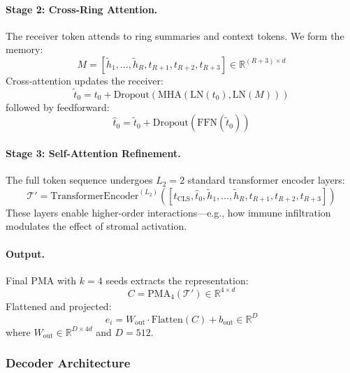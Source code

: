 \paragraph{Stage 2: Cross-Ring Attention.} The receiver token attends to ring summaries and context tokens. We form the memory:
\begin{equation}
    M = [\tilde{h}_1, \ldots, \tilde{h}_R, t_{R+1}, t_{R+2}, t_{R+3}] \in \mathbb{R}^{(R+3) \times d}
\end{equation}
Cross-attention updates the receiver:
\begin{equation}
    \tilde{t}_0 = t_0 + \text{Dropout}(\text{MHA}(\text{LN}(t_0), \text{LN}(M)))
\end{equation}
followed by feedforward:
\begin{equation}
    \hat{t}_0 = \tilde{t}_0 + \text{Dropout}(\text{FFN}(\tilde{t}_0))
\end{equation}

\paragraph{Stage 3: Self-Attention Refinement.} The full token sequence undergoes $L_2 = 2$ standard transformer encoder layers:
\begin{equation}
    \mathcal{T}' = \text{TransformerEncoder}^{(L_2)}([t_{\text{CLS}}, \hat{t}_0, \tilde{h}_1, \ldots, \tilde{h}_R, t_{R+1}, t_{R+2}, t_{R+3}])
\end{equation}
These layers enable higher-order interactions—e.g., how immune infiltration modulates the effect of stromal activation.

\paragraph{Output.} Final PMA with $k=4$ seeds extracts the representation:
\begin{equation}
    C = \text{PMA}_4(\mathcal{T}') \in \mathbb{R}^{4 \times d}
\end{equation}
Flattened and projected:
\begin{equation}
    e_i = W_{\text{out}} \cdot \text{Flatten}(C) + b_{\text{out}} \in \mathbb{R}^D
\end{equation}
where $W_{\text{out}} \in \mathbb{R}^{D \times 4d}$ and $D = 512$.

\subsubsection{Decoder Architecture}


